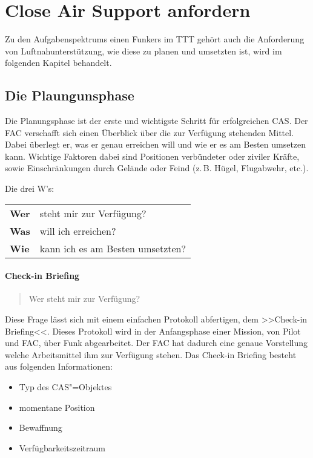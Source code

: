 \pagebreak
\section{Close Air Support anfordern}
	Zu den Aufgabenspektrums einen Funkers im TTT gehört auch die Anforderung von Luftnahunterstützung, wie diese zu planen und umsetzten ist, wird im folgenden Kapitel behandelt.
\subsection{Die Plaungunsphase}
	Die Planungsphase ist der erste und wichtigste Schritt für erfolgreichen CAS. Der FAC verschafft sich einen Überblick über die zur Verfügung stehenden Mittel. Dabei überlegt er, was er genau erreichen will und wie er es am Besten umsetzen kann. Wichtige Faktoren dabei sind Positionen verbündeter oder ziviler Kräfte, sowie Einschränkungen durch Gelände oder Feind (z.\,B. Hügel, Flugabwehr, etc.).
	\par\medskip
	Die drei W's:\\
	\begin{tabular}{ll}
	\textbf{Wer} &  steht mir zur Verfügung?\\ 
	\textbf{Was} &  will ich erreichen?\\ 
	\textbf{Wie} &  kann ich es am Besten umsetzten?\\ 
	\end{tabular} 

\paragraph*{Check-in Briefing}
	\begin{quote}
		\glqq Wer steht mir zur Verfügung?\grqq
	\end{quote}
	Diese Frage lässt sich mit einem einfachen Protokoll abfertigen, dem >>Check-in Briefing<<. Dieses Protokoll wird in der Anfangsphase einer Mission, von Pilot und FAC, über Funk abgearbeitet. Der FAC hat dadurch eine genaue Vorstellung welche Arbeitsmittel ihm zur Verfügung stehen. Das Check-in Briefing besteht aus folgenden Informationen:
	\begin{itemize}
		\item Typ des CAS"=Objektes
		\item momentane Position
		\item Bewaffnung
		\item Verfügbarkeitszeitraum
	\end{itemize}

